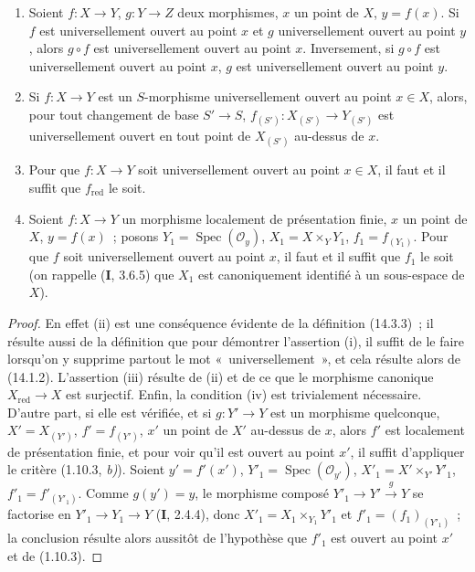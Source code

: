 \begin{proposition}[14.3.4]
\label{IV.14.3.4-fr}
\begin{enumerate}[label=\textup{(\roman*)}]
  \item Soient $f:X\to Y$, $g:Y\to Z$ deux morphismes, $x$ un point de $X$,
  $y=f(x)$. Si $f$ est universellement ouvert au point $x$ et $g$ universellement
  ouvert au point $y$, alors $g\circ f$ est universellement ouvert au point $x$.
  Inversement, si $g\circ f$ est universellement ouvert au point $x$, $g$ est
  universellement ouvert au point $y$.

  \item Si $f:X\to Y$ est un $S$-morphisme universellement ouvert au point
  $x\in X$, alors, pour tout changement de base $S'\to S$,
  $f_{(S')}:X_{(S')}\to Y_{(S')}$ est universellement ouvert en tout point de
  $X_{(S')}$ au-dessus de $x$.

  \item Pour que $f:X\to Y$ soit universellement ouvert au point $x\in X$, il
  faut et il suffit que $f_{\mathrm{red}}$ le soit.

  \item Soient $f:X\to Y$ un morphisme localement de présentation finie, $x$ un
  point de $X$, $y=f(x)$~; posons $Y_1=\operatorname{Spec}(\mathcal O_y)$,
  $X_1=X\times_Y Y_1$, $f_1=f_{(Y_1)}$. Pour que $f$ soit universellement ouvert
  au point $x$, il faut et il suffit que $f_1$ le soit \textup{(on rappelle (\textbf{I}, 3.6.5) que
  $X_1$ est canoniquement identifié à un sous-espace de $X$)}.
\end{enumerate}
\end{proposition}

\begin{proof}
En effet (ii) est une conséquence évidente de la définition (14.3.3)~; il résulte
aussi de la définition que pour démontrer l'assertion (i), il suffit de le faire
lorsqu'on y supprime partout le mot «~universellement~», et cela résulte alors de
(14.1.2). L'assertion (iii) résulte de (ii) et de ce que le morphisme canonique
$X_{\mathrm{red}}\to X$ est surjectif. Enfin, la condition (iv) est trivialement
nécessaire. D'autre part, si elle est vérifiée, et si $g:Y'\to Y$ est un morphisme
quelconque, $X'=X_{(Y')}$, $f'=f_{(Y')}$, $x'$ un point de $X'$ au-dessus de $x$,
alors $f'$ est localement de présentation finie, et pour voir qu'il est ouvert au
point $x'$, il suffit d'appliquer le critère (1.10.3, \emph{b)}). Soient
$y'=f'(x')$, $Y'_1=\operatorname{Spec}(\mathcal O_{y'})$,
$X'_1=X'\times_{Y'}Y'_1$, $f'_1=f'_{(Y'_1)}$. Comme $g(y')=y$, le morphisme
composé $Y'_1\to Y'\xrightarrow{g}Y$ se factorise en $Y'_1\to Y_1\to Y$ (\textbf{I}, 2.4.4), donc
$X'_1=X_1\times_{Y_1}Y'_1$ et $f'_1=(f_1)_{(Y'_1)}$~; la conclusion résulte alors
aussitôt de l'hypothèse que $f'_1$ est ouvert au point $x'$ et de (1.10.3).
\end{proof}

